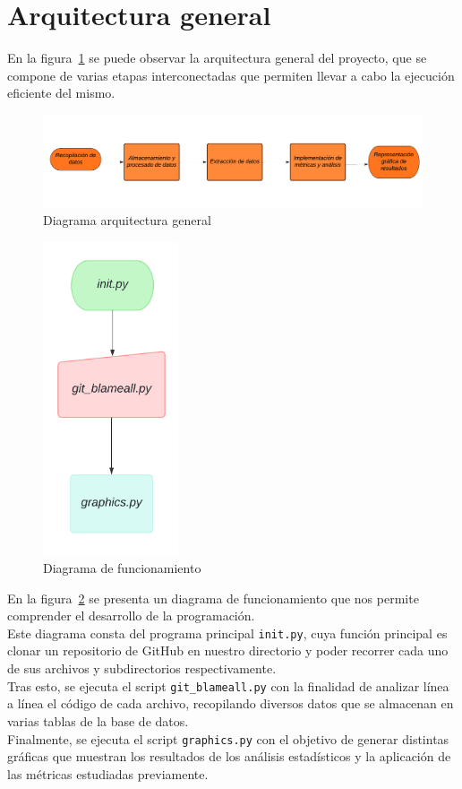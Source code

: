 \documentclass[a4paper, 12pt]{book}
\begin{document}
\section{Arquitectura general} 
\label{sec:arquitectura-general}

En la figura~\ref{fig:arquitectura} se puede observar la arquitectura general del proyecto, que se compone de varias etapas interconectadas que permiten llevar a cabo la ejecución eficiente del mismo.

\begin{figure}
  \centering
  \includegraphics[width=14cm, keepaspectratio]{img/Arquitectura_general.png}
  \caption{Diagrama arquitectura general}
  \label{fig:arquitectura}
\end{figure}

\begin{figure}
  \centering
  \includegraphics[width=4cm, keepaspectratio]{img/Diagrama_Funcionamiento.png}
  \caption{Diagrama de funcionamiento}
  \label{fig:funcionamiento}
\end{figure}

En la figura~\ref{fig:funcionamiento} se presenta un diagrama de funcionamiento que nos permite comprender el desarrollo de la programación. 
\\Este diagrama consta del programa principal \texttt{init.py}, cuya función principal es clonar un repositorio de GitHub en nuestro directorio y poder recorrer cada uno de sus archivos y subdirectorios respectivamente.
\\Tras esto, se ejecuta el script \texttt{git\_blameall.py} con la finalidad de analizar línea a línea el código de cada archivo, recopilando diversos datos que se almacenan en varias tablas de la base de datos.
\\Finalmente, se ejecuta el script \texttt{graphics.py} con el objetivo de generar distintas gráficas que muestran los resultados de los análisis estadísticos y la aplicación de las métricas estudiadas previamente.
\end{document}
